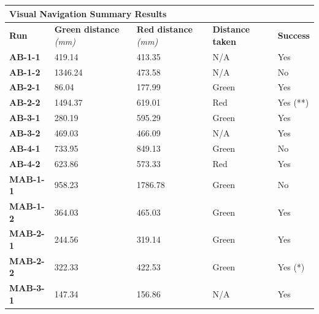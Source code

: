 \documentclass[a4paper,11pt,twoside,openright]{article}
\begin{document}
\begin{table}[]
\centering
\begin{tabular}{|l|l|l|l|l|}
\hline
\multicolumn{5}{|l|}{\textbf{Visual Navigation Summary Results}}                                                \\ \hline
\textbf{Run}     & \textbf{Green distance} \textit{(mm)} & \textbf{Red distance} \textit{(mm)} & \textbf{Distance taken} & \textbf{Success} \\ \hline
\textbf{AB-1-1}  & 419.14                  & 413.35                & N/A                     & Yes              \\ \hline
\textbf{AB-1-2}  & 1346.24                 & 473.58                & N/A                     & No               \\ \hline
\textbf{AB-2-1}  & 86.04                   & 177.99                & Green                   & Yes              \\ \hline
\textbf{AB-2-2}  & 1494.37                 & 619.01                & Red                     & Yes (**)         \\ \hline
\textbf{AB-3-1}  & 280.19                  & 595.29                & Green                   & Yes              \\ \hline
\textbf{AB-3-2}  & 469.03                  & 466.09                & N/A                     & Yes              \\ \hline
\textbf{AB-4-1}  & 733.95                  & 849.13                & Green                   & No               \\ \hline
\textbf{AB-4-2}  & 623.86                  & 573.33                & Red                     & Yes              \\ \hline
\textbf{MAB-1-1} & 958.23                  & 1786.78               & Green                   & No               \\ \hline
\textbf{MAB-1-2} & 364.03                  & 465.03                & Green                   & Yes              \\ \hline
\textbf{MAB-2-1} & 244.56                  & 319.14                & Green                   & Yes              \\ \hline
\textbf{MAB-2-2} & 322.33                  & 422.53                & Green                   & Yes (*)          \\ \hline
\textbf{MAB-3-1} & 147.34                  & 156.86                & N/A                     & Yes              \\ \hline

\end{tabular}
\end{table}
\end{document}

